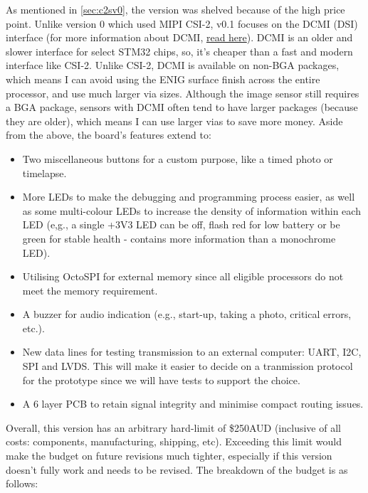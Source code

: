 \documentclass[10pt]{article}
\newcommand{\nl}{\newline \newline}
\begin{document}
As mentioned in \autoref{sec:c2sv0}, the version was shelved because of the high price point. Unlike version 0 which used MIPI CSI-2, v0.1 focuses on the DCMI (DSI) interface (for more information about DCMI, \href{https://www.st.com/resource/en/application_note/an5020-introduction-to-digital-camera-interface-dcmi-for-stm32-mcus-stmicroelectronics.pdf}{read here}).
DCMI is an older and slower interface for select STM32 chips, so, it's cheaper than a fast and modern interface like CSI-2.
Unlike CSI-2, DCMI is available on non-BGA packages, which means I can avoid using the ENIG surface finish across the entire processor, and use much larger via sizes.
Although the image sensor still requires a BGA package, sensors with DCMI often tend to have larger packages (because they are older), which means I can use larger vias to save more money.
\nl
Aside from the above, the board's features extend to:
\begin{itemize}
    \item Two miscellaneous buttons for a custom purpose, like a timed photo or timelapse.
    \item More LEDs to make the debugging and programming process easier, as well as some multi-colour LEDs to increase the density of information within each LED (e,g., a single +3V3 LED can be off, flash red for low battery or be green for stable health - contains more information than a monochrome LED).
    \item Utilising OctoSPI for external memory since all eligible processors do not meet the memory requirement.
    \item A buzzer for audio indication (e.g., start-up, taking a photo, critical errors, etc.).
    \item New data lines for testing transmission to an external computer: UART, I2C, SPI and LVDS. This will make it easier to decide on a tranmission protocol for the prototype since we will have tests to support the choice.
    \item A 6 layer PCB to retain signal integrity and minimise compact routing issues.
\end{itemize}
Overall, this version has an arbitrary hard-limit of \$250AUD (inclusive of all costs: components, manufacturing, shipping, etc). Exceeding this limit would make the budget on future revisions much tighter, especially if this version doesn't fully work and needs to be revised.
The breakdown of the budget is as follows:
\end{document}
